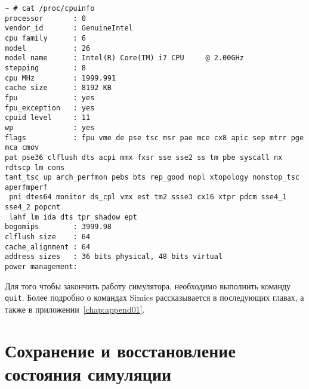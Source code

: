 \begin{lstlisting}
~ # cat /proc/cpuinfo                                                           
processor       : 0                                                             
vendor_id       : GenuineIntel                                                  
cpu family      : 6                                                             
model           : 26                                                            
model name      : Intel(R) Core(TM) i7 CPU     @ 2.00GHz               
stepping        : 8                                                             
cpu MHz         : 1999.991                                                      
cache size      : 8192 KB                                                       
fpu             : yes                                                           
fpu_exception   : yes                                                           
cpuid level     : 11                                                            
wp              : yes                                                           
flags           : fpu vme de pse tsc msr pae mce cx8 apic sep mtrr pge mca cmov 
pat pse36 clflush dts acpi mmx fxsr sse sse2 ss tm pbe syscall nx rdtscp lm cons
tant_tsc up arch_perfmon pebs bts rep_good nopl xtopology nonstop_tsc aperfmperf
 pni dtes64 monitor ds_cpl vmx est tm2 ssse3 cx16 xtpr pdcm sse4_1 sse4_2 popcnt
 lahf_lm ida dts tpr_shadow ept                                                 
bogomips        : 3999.98                                                       
clflush size    : 64                                                            
cache_alignment : 64                                                            
address sizes   : 36 bits physical, 48 bits virtual                             
power management:                                                               
\end{lstlisting}

Для того чтобы закончить работу симулятора, необходимо выполнить команду \texttt{quit}. Более подробно о командах Simics рассказывается в последующих главах, а также в приложении~\ref{chap:append01}.

\section{Сохранение и восстановление состояния симуляции}

\todo



